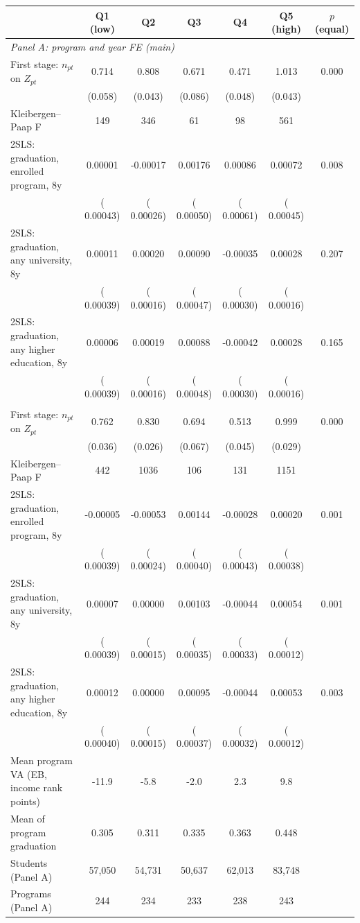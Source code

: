 \begin{tabular}{lcccccc}
\toprule
 & Q1 (low) & Q2 & Q3 & Q4 & Q5 (high) & \(p\) (equal) \\
\midrule
\multicolumn{7}{l}{\textit{Panel A: program and year FE (main)}} \\
First stage: \(n_{pt}\) on \(Z_{pt}\) &  0.714\sym{***} &  0.808\sym{***} &  0.671\sym{***} &  0.471\sym{***} &  1.013\sym{***} & 0.000 \\
 & (0.058) & (0.043) & (0.086) & (0.048) & (0.043) & \\
Kleibergen--Paap F &    149 &    346 &     61 &     98 &    561 & \\
2SLS: graduation, enrolled program, 8y &  0.00001 & -0.00017 &  0.00176\sym{***} &  0.00086 &  0.00072 & 0.008 \\
 & ( 0.00043) & ( 0.00026) & ( 0.00050) & ( 0.00061) & ( 0.00045) & \\
2SLS: graduation, any university, 8y &  0.00011 &  0.00020 &  0.00090\sym{*} & -0.00035 &  0.00028\sym{*} & 0.207 \\
 & ( 0.00039) & ( 0.00016) & ( 0.00047) & ( 0.00030) & ( 0.00016) & \\
2SLS: graduation, any higher education, 8y &  0.00006 &  0.00019 &  0.00088\sym{*} & -0.00042 &  0.00028\sym{*} & 0.165 \\
 & ( 0.00039) & ( 0.00016) & ( 0.00048) & ( 0.00030) & ( 0.00016) & \\
\addlinespace
\multicolumn{7}{l}{\textit{Panel B: program and university \(\times\) year FE}} \\
First stage: \(n_{pt}\) on \(Z_{pt}\) &  0.762\sym{***} &  0.830\sym{***} &  0.694\sym{***} &  0.513\sym{***} &  0.999\sym{***} & 0.000 \\
 & (0.036) & (0.026) & (0.067) & (0.045) & (0.029) & \\
Kleibergen--Paap F &    442 &   1036 &    106 &    131 &   1151 & \\
2SLS: graduation, enrolled program, 8y & -0.00005 & -0.00053\sym{**} &  0.00144\sym{***} & -0.00028 &  0.00020 & 0.001 \\
 & ( 0.00039) & ( 0.00024) & ( 0.00040) & ( 0.00043) & ( 0.00038) & \\
2SLS: graduation, any university, 8y &  0.00007 &  0.00000 &  0.00103\sym{***} & -0.00044 &  0.00054\sym{***} & 0.001 \\
 & ( 0.00039) & ( 0.00015) & ( 0.00035) & ( 0.00033) & ( 0.00012) & \\
2SLS: graduation, any higher education, 8y &  0.00012 &  0.00000 &  0.00095\sym{***} & -0.00044 &  0.00053\sym{***} & 0.003 \\
 & ( 0.00040) & ( 0.00015) & ( 0.00037) & ( 0.00032) & ( 0.00012) & \\
\midrule
Mean program VA (EB, income rank points) & -11.9 &  -5.8 &  -2.0 &   2.3 &   9.8 & \\
Mean of program graduation & 0.305 & 0.311 & 0.335 & 0.363 & 0.448 & \\
Students (Panel A) &    57,050 &    54,731 &    50,637 &    62,013 &    83,748 & \\
Programs (Panel A) &    244 &    234 &    233 &    238 &    243 & \\
\bottomrule
\end{tabular}

